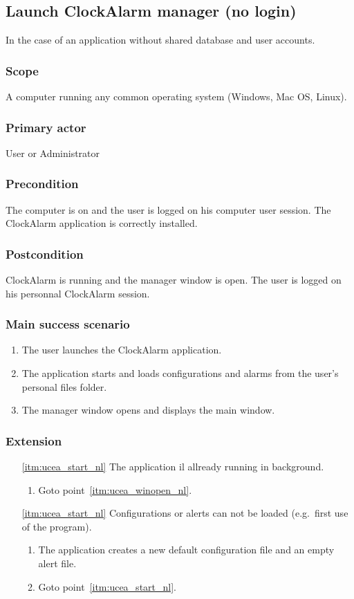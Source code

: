 \subsection {Launch ClockAlarm manager (no login)}\label{subsec:usecase_launch}
In the case of an application without shared database and user accounts.
\subsubsection{Scope}
A computer running any common operating system (Windows, Mac OS, Linux).
\subsubsection{Primary actor}
User or Administrator
\subsubsection{Precondition}
The computer is on and the user is logged on his computer user session. The ClockAlarm application is correctly installed.
\subsubsection{Postcondition}
ClockAlarm is running and the manager window is open. The user is logged on his personnal ClockAlarm session.
\subsubsection{Main success scenario}
\begin{enumerate}
	\item The user launches the ClockAlarm application.
	\item\label{itm:ucea_start_nl} The application starts and loads configurations and alarms from the user's personal files folder.
	\item\label{itm:ucea_winopen_nl} The manager window opens and displays the main window.
\end{enumerate}
\subsubsection{Extension}
\begin{enumerate}
	\item[\ref{itm:ucea_start_nl}] The application il allready running in background.
	\begin{enumerate}[i]
		\item Goto point~\ref{itm:ucea_winopen_nl}.
	\end{enumerate}
	
	\item[\ref{itm:ucea_start_nl}] Configurations or alerts can not be loaded (e.g.\ first use of the program).
	\begin{enumerate}[i]
		\item The application creates a new default configuration file and an empty alert file.
		\item Goto point~\ref{itm:ucea_start_nl}.
	\end{enumerate}
\end{enumerate}

